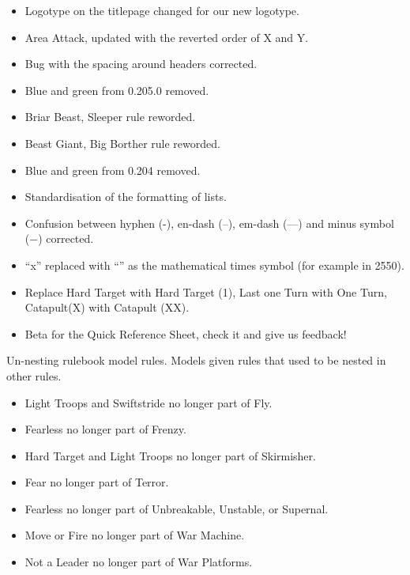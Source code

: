 

\subtitle{0.205.2}

\begin{itemize}
\item Logotype on the titlepage changed for our new logotype.
\item Area Attack, updated with the reverted order of X and Y.
\item Bug with the spacing around headers corrected.
\end{itemize}

\subtitle{0.205.1}

\begin{itemize}
\item Blue and green from 0.205.0 removed.
\item Briar Beast, Sleeper rule reworded.
\item Beast Giant, Big Borther rule reworded.
\end{itemize}


\subtitle{0.205.0}

\begin{itemize}
\item Blue and green from 0.204 removed.
\item Standardisation of the formatting of lists.
\item Confusion between hyphen (-), en-dash (--), em-dash (---) and minus symbol (−) corrected.
\item \enquote{x} replaced with \enquote{\timess{}} as the mathematical times symbol (for example in 25\timess{}50).
\item Replace Hard Target with Hard Target (1), Last one Turn with One Turn, Catapult(X) with Catapult (X\timess{}X).
\item Beta for the Quick Reference Sheet, check it and give us feedback!
\end{itemize}

Un-nesting rulebook model rules. Models given rules that used to be nested in other rules.
\begin{itemize}
\item Light Troops and Swiftstride no longer part of Fly.
\item Fearless no longer part of Frenzy.
\item Hard Target and Light Troops no longer part of Skirmisher.
\item Fear no longer part of Terror.
\item Fearless no longer part of Unbreakable, Unstable, or Supernal.
\item Move or Fire no longer part of War Machine.
\item Not a Leader no longer part of War Platforms.
\end{itemize}

